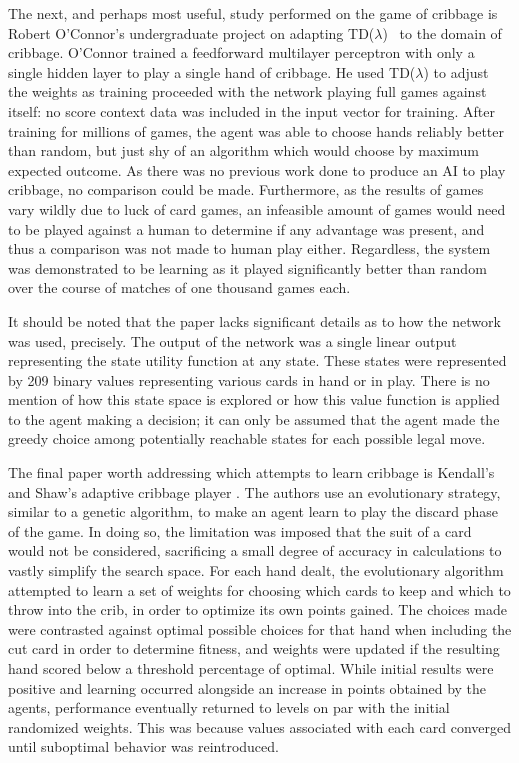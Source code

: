 The next,
and perhaps most useful,
study performed on the game of cribbage is Robert O'Connor's undergraduate
project
\cite{roconnor_cs486}
on adapting TD($\lambda$)~\cite{tdgammon} to the domain of cribbage.
%
O'Connor trained a feedforward multilayer perceptron with only a single hidden
layer to play a single hand of cribbage.
%
He used TD($\lambda$) to adjust the weights as training proceeded with the
network playing full games against itself:
no score context data was included in the input vector for training.
%
After training for millions of games,
the agent was able to choose hands reliably better than random,
but just shy of an algorithm which would choose by maximum expected outcome.
%
As there was no previous work done to produce an AI to play cribbage,
no comparison could be made.
%
Furthermore,
as the results of games vary wildly due to luck of card games,
an infeasible amount of games would need to be played against a human to
determine if any advantage was present,
and thus a comparison was not made to human play either.
%
Regardless,
the system was demonstrated to be learning as it played significantly
better than random over the course of matches of one thousand games each.

It should be noted that the paper lacks significant details
as to how the network was used, precisely.
%
The output of the network was a single linear output representing the state
utility function at any state.
%
These states were represented by 209 binary values representing various cards in
hand or in play.
%
There is no mention of how this state space is explored or how this value
function is applied to the agent making a decision;
it can only be assumed that the agent made the greedy choice among potentially
reachable states for each possible legal move.

The final paper worth addressing which attempts to learn cribbage
is Kendall's and Shaw's adaptive cribbage player
\cite{adaptive_cribbage}.
%
The authors use an evolutionary strategy,
similar to a genetic algorithm,
to make an agent learn to play the discard phase of the game.
%
In doing so,
the limitation was imposed that the suit of a card would not be considered,
sacrificing a small degree of accuracy in calculations to vastly simplify the
search space.
%
For each hand dealt,
the evolutionary algorithm attempted to learn a set of weights for choosing
which cards to keep and which to throw into the crib,
in order to optimize its own points gained.
%
The choices made were contrasted against optimal possible choices for that hand
when including the cut card in order to determine fitness,
and weights were updated if the resulting hand scored below a threshold
percentage of optimal.
%
While initial results were positive and learning occurred alongside an increase
in points obtained by the agents,
performance eventually returned to levels on par with the initial randomized
weights.
%
This was because values associated with each card converged until suboptimal
behavior was reintroduced.

